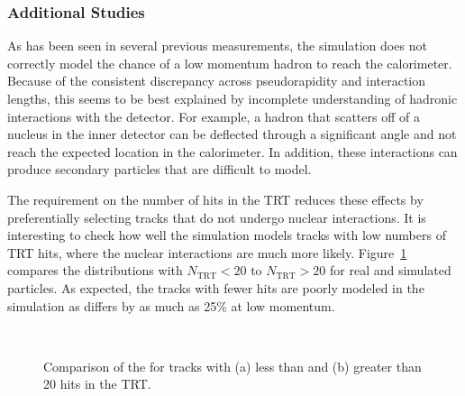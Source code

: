 \subsubsection{Additional Studies}
\label{sec:additional}

As has been seen in several previous measurements, the simulation does not correctly model the chance of a low momentum hadron to reach the calorimeter.
Because of the consistent discrepancy across pseudorapidity and interaction lengths, this seems to be best explained by incomplete understanding of hadronic interactions with the detector.
For example, a hadron that scatters off of a nucleus in the inner detector can be deflected through a significant angle and not reach the expected location in the calorimeter.
In addition, these interactions can produce secondary particles that are difficult to model.

The requirement on the number of hits in the TRT reduces these effects by preferentially selecting tracks that do not undergo nuclear interactions.
It is interesting to check how well the simulation models tracks with low numbers of TRT hits, where the nuclear interactions are much more likely. 
Figure~\ref{fig:eoverp_trt} compares the distributions with $N_{\mathrm{TRT}} < 20$ to $N_{\mathrm{TRT}} > 20$ for real and simulated particles.
As expected, the tracks with fewer hits are poorly modeled in the simulation as \epcor differs by as much as 25\% at low momentum.

\begin{figure}[h]
\centering
{}
~
\caption{Comparison of the \epcor for tracks with (a) less than and (b) greater than 20 hits in the TRT.}
\label{fig:eoverp_trt}
\end{figure}

